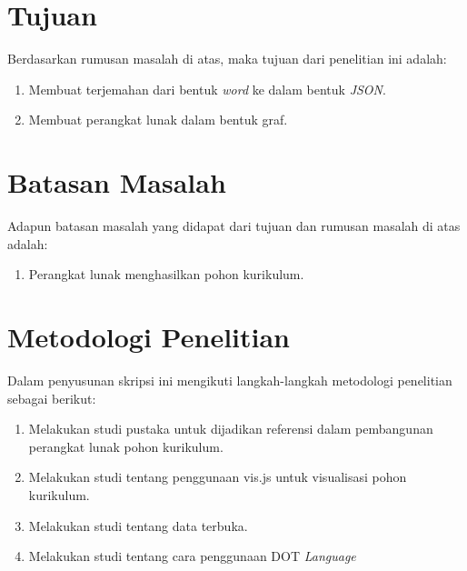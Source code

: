 \section{Tujuan}
Berdasarkan rumusan masalah di atas, maka tujuan dari penelitian ini adalah: 
\begin{enumerate}
\item Membuat terjemahan dari bentuk \textit{word} ke dalam bentuk \textit{JSON}.
\item Membuat perangkat lunak dalam bentuk graf.
\end{enumerate}

\section{Batasan Masalah}
\label{sec:batasan}
Adapun batasan masalah yang didapat dari tujuan dan rumusan masalah di atas adalah:

\begin{enumerate}
\item Perangkat lunak menghasilkan pohon kurikulum.
\end{enumerate}

\section{Metodologi Penelitian}
\label{sec:Metodologi Penelitian}
Dalam penyusunan skripsi ini mengikuti langkah-langkah metodologi penelitian sebagai berikut:

\begin{enumerate}
\item Melakukan studi pustaka untuk dijadikan referensi dalam pembangunan perangkat lunak pohon kurikulum.
\item Melakukan studi tentang penggunaan vis.js untuk visualisasi pohon kurikulum.
\item Melakukan studi tentang data terbuka.
\item Melakukan studi tentang cara penggunaan DOT \textit{Language}
\end{enumerate}


